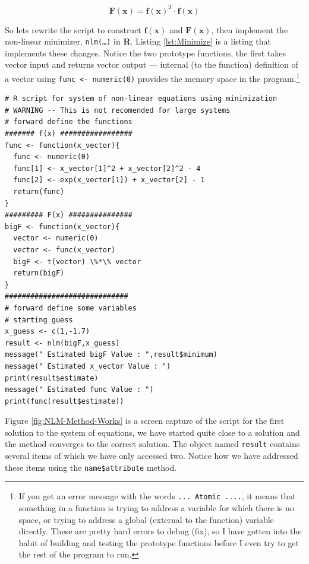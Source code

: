 \begin{equation}
\mathbf{F(x)} = \mathbf{f(x)}^T \cdot \mathbf{f(x)}
\end{equation}

So lets rewrite the script to construct $\mathbf{f(x)}$ and $\mathbf{F(x)}$, then implement the non-linear minimizer, \texttt{nlm(\dots)} in \textbf{R}.   Listing \ref{lst:Minimize} is a listing that implements these changes.  Notice the two prototype functions, the first takes vector input and returns vector output --- internal (to the function) definition of a vector using \texttt{func <- numeric(0)} provides the memory space in the program.\footnote{If you get an error message with the words \texttt{... Atomic ....}, it means that something in a function is trying to address a variable for which there is no space, or trying to address a global (external to the function) variable directly.  These are pretty hard errors to debug (fix), so I have gotten into the habit of building and testing the prototype functions before I even try to get the rest of the program to run.}

\begin{lstlisting}[caption=R code demonstrating Non-Linear by Minimization , label=lst:Minimize]
# R script for system of non-linear equations using minimization
# WARNING -- This is not recomended for large systems
# forward define the functions
####### f(x) #################
func <- function(x_vector){
  func <- numeric(0)
  func[1] <- x_vector[1]^2 + x_vector[2]^2 - 4
  func[2] <- exp(x_vector[1]) + x_vector[2] - 1
  return(func)
}
######### F(x) ###############
bigF <- function(x_vector){
  vector <- numeric(0)
  vector <- func(x_vector)
  bigF <- t(vector) \%*\% vector
  return(bigF)
}
#############################
# forward define some variables
# starting guess
x_guess <- c(1,-1.7)
result <- nlm(bigF,x_guess)
message(" Estimated bigF Value : ",result$minimum)
message(" Estimated x_vector Value : ")
print(result$estimate)
message(" Estimated func Value : ")
print(func(result$estimate))
\end{lstlisting}

Figure \ref{fig:NLM-Method-Works} is a screen capture of the script for the first solution to the system of equations, we have started quite close to a solution and the method converges to the correct solution.  The object named \texttt{result} contains several items of which we have only accessed two.  Notice how we have addressed these items using the \texttt{name\$attribute} method.

